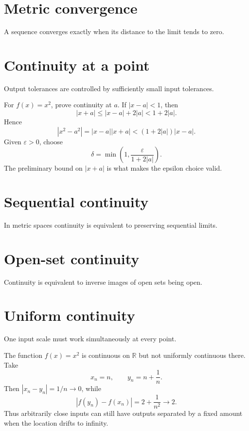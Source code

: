 \section{Metric convergence}
A sequence converges exactly when its distance to the limit tends to zero.

\section{Continuity at a point}
Output tolerances are controlled by sufficiently small input tolerances.


\begin{example}\label{ex:ii05-expand-01}
For \(f(x)=x^2\), prove continuity at \(a\). If \(|x-a|<1\), then
\[
|x+a|\le |x-a|+2|a|<1+2|a|.
\]
Hence
\[
|x^2-a^2|=|x-a||x+a|
<(1+2|a|)|x-a|.
\]
Given \(\varepsilon>0\), choose
\[
\delta=\min\left(1,\frac{\varepsilon}{1+2|a|}\right).
\]
The preliminary bound on \(|x+a|\) is what makes the epsilon choice valid.
\end{example}
\section{Sequential continuity}
In metric spaces continuity is equivalent to preserving sequential limits.

\section{Open-set continuity}
Continuity is equivalent to inverse images of open sets being open.

\section{Uniform continuity}
One input scale must work simultaneously at every point.


\begin{example}\label{ex:ii05-expand-02}
The function \(f(x)=x^2\) is continuous on \(\mathbb R\) but not uniformly
continuous there. Take
\[
x_n=n,\qquad y_n=n+\frac1n.
\]
Then \(|x_n-y_n|=1/n\to0\), while
\[
|f(y_n)-f(x_n)|
=2+\frac1{n^2}\to2.
\]
Thus arbitrarily close inputs can still have outputs separated by a fixed
amount when the location drifts to infinity.
\end{example}
